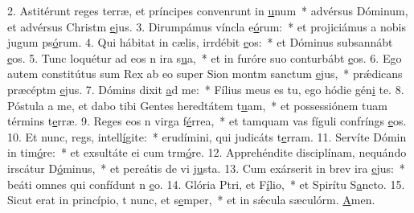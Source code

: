2. Astitérunt reges terræ, et príncipes convenrunt in \uline{u}num~* advérsus Dóminum, et advérsus Christm \uline{e}jus.
3. Dirumpámus víncla e\uline{ó}rum:~* et projiciámus a nobis jugum ps\uline{ó}rum.
4. Qui hábitat in cælis, irrdébit \uline{e}os:~* et Dóminus subsannábt \uline{e}os.
5. Tunc loquétur ad eos n ira s\uline{u}a,~* et in furóre suo conturbábt \uline{e}os.
6. Ego autem constitútus sum Rex ab eo super Sion montm sanctum \uline{e}jus,~* prǽdicans præcéptm \uline{e}jus.
7. Dómins dixit \uline{a}d me:~* Fílius meus es tu, ego hódie gén\uline{i} te.
8. Póstula a me, et dabo tibi Gentes heredtátem t\uline{u}am,~* et possessiónem tuam términs t\uline{e}rræ.
9. Reges eos n virga f\uline{é}rrea,~* et tamquam vas fíguli confríngs \uline{e}os.
10. Et nunc, regs, intell\uline{í}gite:~* erudímini, qui judicáts t\uline{e}rram.
11. Servíte Dómin in tim\uline{ó}re:~* et exsultáte ei cum trm\uline{ó}re.
12. Apprehéndite disciplínam, nequándo irscátur D\uline{ó}minus,~* et pereátis de vi j\uline{u}sta.
13. Cum exárserit in brev ira \uline{e}jus:~* beáti omnes qui confídunt n \uline{e}o.
14. Glória Ptri, et F\uline{í}lio,~* et Spirítu S\uline{a}ncto.
15. Sicut erat in princípio, t nunc, et s\uline{e}mper,~* et in sǽcula sæculórm. \uline{A}men.

